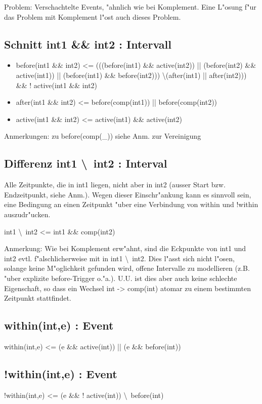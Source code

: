 \documentclass[article,colorback,accentcolor=tud4c]{tudreport}
\begin{document}
Problem: Verschachtelte Events, "ahnlich wie bei Komplement. Eine L"osung f"ur das Problem mit Komplement l"ost auch dieses Problem.

\subsection{Schnitt int1 \&\& int2 : Intervall}
\begin{itemize}
\item before(int1 \&\& int2) <= (((before(int1) \&\& active(int2)) || (before(int2) \&\& active(int1)) || (before(int1) \&\& before(int2))) \textbackslash (after(int1) || after(int2))) \&\& ! active(int1 \&\& int2)
\item after(int1 \&\& int2) <= before(comp(int1)) || before(comp(int2))
\item active(int1 \&\& int2) <= active(int1) \&\& active(int2)
\end{itemize}
Anmerkungen: zu before(comp(\_)) siehe Anm. zur Vereinigung

\subsection{Differenz int1 \textbackslash\ int2 : Interval}
Alle Zeitpunkte, die in int1 liegen, nicht aber in int2 (ausser Start bzw. Endzeitpunkt, siehe Anm.). Wegen dieser Einschr"ankung kann es sinnvoll sein, eine Bedingung an einen Zeitpunkt "uber eine Verbindung von within und !within auszudr"ucken.

int1 \textbackslash\ int2 <= int1 \&\& comp(int2)

Anmerkung: Wie bei Komplement erw"ahnt, sind die Eckpunkte von int1 und int2 evtl. f"alschlicherweise mit in int1 \textbackslash\ int2. Dies l"asst sich nicht l"osen, solange keine M"oglichkeit gefunden wird, offene Intervalle zu modellieren (z.B. "uber explizite before-Trigger o."a.). U.U. ist dies aber auch keine schlechte Eigenschaft, so dass ein Wechsel int -> comp(int) atomar zu einem bestimmten Zeitpunkt stattfindet.

\subsection{within(int,e) : Event}
within(int,e) <= (e \&\& active(int)) || (e \&\& before(int))

\subsection{!within(int,e) : Event}
!within(int,e) <= (e \&\& ! active(int)) \textbackslash\ before(int)
\end{document}
